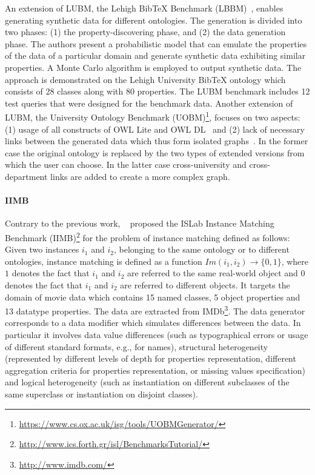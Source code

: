 An extension of LUBM, the Lehigh BibTeX Benchmark (LBBM)~\cite{Wang2005}, enables generating synthetic data for different ontologies. The generation is divided into two phases: (1) the property-discovering phase, and (2) the data generation phase. The authors present a probabilistic model that can emulate the properties of the data of a particular domain and generate synthetic data exhibiting similar properties. A Monte Carlo algorithm is employed to output synthetic data. The approach is demonstrated on the Lehigh University BibTeX ontology which consists of 28 classes along with 80 properties. The LUBM benchmark includes 12 test queries that were designed for the benchmark data. Another extension of LUBM, the University Ontology Benchmark (UOBM)\footnote{\url{https://www.cs.ox.ac.uk/isg/tools/UOBMGenerator/}}, focuses on two aspects: (1) usage of all constructs of OWL Lite and OWL DL~\cite{owl} and (2) lack of necessary links between the generated data which thus form isolated graphs~\cite{Ma:2006:TCO:2094613.2094629}. In the former case the original ontology is replaced by the two types of extended versions from which the user can choose. In the latter case cross-university and cross-department links are added to create a more complex graph.

\paragraph{IIMB} Contrary to the previous work, ~\cite{Ferrara08OM} proposed the ISLab Instance Matching Benchmark (IIMB)\footnote{\url{http://www.ics.forth.gr/isl/BenchmarksTutorial/}} for the problem of instance matching defined as follows: Given two instances $i_1$ and $i_2$, belonging to the same ontology or to different ontologies, instance matching is defined as a function $Im(i_1, i_2) \rightarrow \{0, 1\}$,  where $1$ denotes the fact that $i_1$ and $i_2$ are referred to the same real-world object and $0$ denotes the fact that $i_1$ and $i_2$ are referred to different objects. It targets the domain of movie data which contains 15 named classes, 5 object properties and 13 datatype properties. The data are extracted from IMDb\footnote{\url{http://www.imdb.com/}}. The data generator corresponds to a data modifier which simulates differences between the data. In particular it involves data value differences (such as typographical errors or usage of different standard formats, e.g., for names), structural heterogeneity (represented by different levels of depth for properties representation, different aggregation criteria for properties representation, or missing values specification) and logical heterogeneity (such as instantiation on different subclasses of the same superclass or instantiation on disjoint classes).


